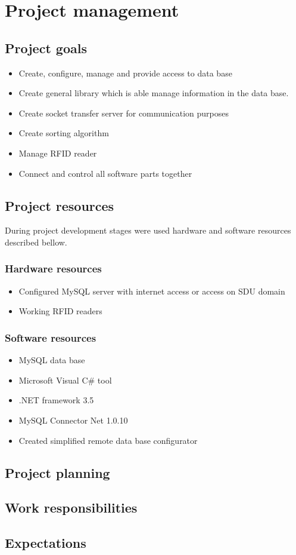 %
\section{Project management}

\subsection{Project goals}

\begin{itemize}
	\item Create, configure, manage and provide access to data base
	\item Create general library which is able manage information in the data base.
	\item Create socket transfer server for communication purposes
	\item Create sorting algorithm
	\item Manage RFID reader
	\item Connect and control all software parts together
\end{itemize}

\subsection{Project resources}

During project development stages were used hardware and software resources described bellow.

\subsubsection{Hardware resources}
\begin{itemize}
	\item Configured MySQL server with internet access or access on SDU domain
	\item Working RFID readers
\end{itemize}

\subsubsection{Software resources}
\begin{itemize}
	\item MySQL data base
	\item Microsoft Visual C\# tool
	\item .NET framework 3.5
	\item MySQL Connector Net 1.0.10
	\item Created simplified remote data base configurator
\end{itemize}

\subsection{Project planning}

\subsection{Work responsibilities}

\subsection{Expectations}